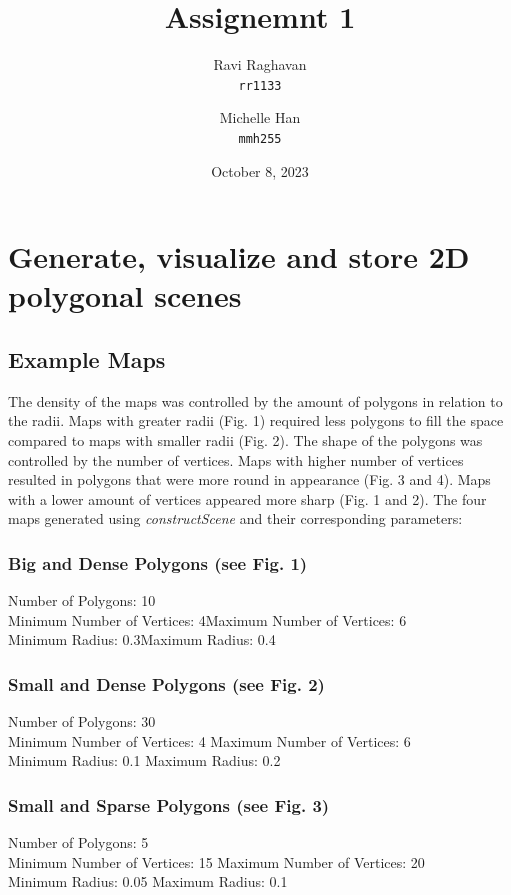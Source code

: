 \documentclass{article}
\title{Assignemnt 1}
\date{October 8, 2023}
\author{
  Ravi Raghavan\\
  \texttt{rr1133}
  \and
  Michelle Han\\
  \texttt{mmh255}
}
\begin{document}
\maketitle
\section{Generate, visualize and store 2D polygonal scenes}

\subsection{Example Maps}
The density of the maps was controlled by the amount of polygons in relation to the radii. Maps with greater radii (Fig. 1) required less polygons to fill the space compared to maps with smaller radii (Fig. 2). The shape of the polygons was controlled by the number of vertices. Maps with higher number of vertices resulted in polygons that were more round in appearance (Fig. 3 and 4). Maps with a lower amount of vertices appeared more sharp (Fig. 1 and 2). The four maps generated using \textit{constructScene} and their corresponding parameters:
\subsubsection{Big and Dense Polygons (see Fig. 1)}
Number of Polygons: 10
\\Minimum Number of Vertices: 4\space\space\space\space\space\space Maximum Number of Vertices: 6
\\Minimum Radius: 0.3\space\space\space\space\space\space\space\space\space\space\space \space\space\space\space\space\space \space\space\space Maximum Radius: 0.4
\subsubsection{Small and Dense Polygons (see Fig. 2)}
Number of Polygons: 30 
\\Minimum Number of Vertices: 4 \space\space\space\space\space\space Maximum Number of Vertices: 6
\\Minimum Radius: 0.1 \space\space\space\space\space\space\space\space\space\space\space \space\space\space\space\space\space \space\space\space Maximum Radius: 0.2
\subsubsection{Small and Sparse Polygons (see Fig. 3)}
Number of Polygons: 5
\\Minimum Number of Vertices: 15 \space\space\space\space\space\space Maximum Number of Vertices: 20
\\Minimum Radius: 0.05 \space\space\space\space\space\space\space\space\space\space\space \space\space\space\space\space\space \space\space\space Maximum Radius: 0.1
\end{document}
